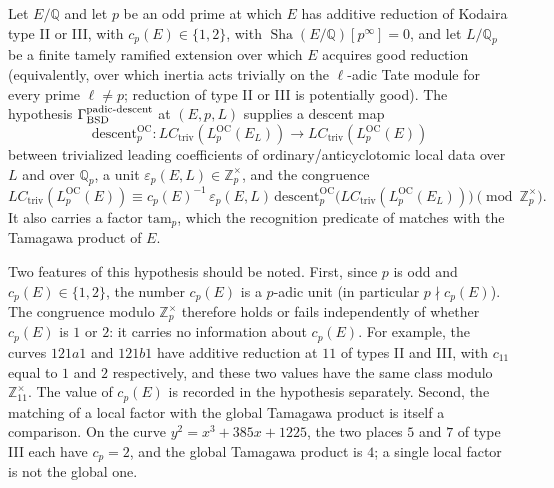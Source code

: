 \documentclass[11pt]{article}
\theoremstyle{definition}
\newcommand{\Q}{\mathbb{Q}}
\newcommand{\Z}{\mathbb{Z}}
\newcommand{\Qp}{\mathbb{Q}_p}
\newcommand{\Zp}{\mathbb{Z}_p}
\newcommand{\Sha}{\operatorname{Sha}}
\begin{document}
\begin{definition}\label{def:closure:gamma-padic-descent}
Let $E/\Q$ and let $p$ be an odd prime at which $E$ has additive
reduction of Kodaira type II or III, with $c_p(E)\in\{1,2\}$, with
$\Sha(E/\Q)[p^\infty]=0$, and let $L/\Qp$ be a finite tamely ramified
extension over which $E$ acquires good reduction (equivalently, over
which inertia acts trivially on the $\ell$-adic Tate module for every
prime $\ell\neq p$; reduction of type II or III is potentially good).  The hypothesis
$\Gamma_{\mathrm{BSD}}^{\mathrm{padic\text{-}descent}}$ at $(E,p,L)$ supplies a descent map
\[
  \mathrm{descent}_p^{\mathrm{OC}}:
  LC_{\mathrm{triv}}(L_p^{\mathrm{OC}}(E_L))
  \longrightarrow
  LC_{\mathrm{triv}}(L_p^{\mathrm{OC}}(E))
\]
between trivialized leading coefficients of ordinary/anticyclotomic local
data over $L$ and over $\Qp$, a unit $\varepsilon_p(E,L)\in\Zp^\times$, and
the congruence
\[
  LC_{\mathrm{triv}}(L_p^{\mathrm{OC}}(E)) \equiv
  c_p(E)^{-1}\,\varepsilon_p(E,L)\,
  \mathrm{descent}_p^{\mathrm{OC}}
    \bigl(LC_{\mathrm{triv}}(L_p^{\mathrm{OC}}(E_L))\bigr)
  \pmod{\Zp^\times}.
\]
It also carries a factor $\mathrm{tam}_p$, which the recognition predicate
of  matches with the Tamagawa product of $E$.
\end{definition}

Two features of this hypothesis should be noted.  First, since $p$ is odd
and $c_p(E)\in\{1,2\}$, the number $c_p(E)$ is a $p$-adic unit (in
particular $p\nmid c_p(E)$).  The congruence modulo $\Zp^\times$ therefore
holds or fails independently of whether $c_p(E)$ is $1$ or $2$: it carries
no information about $c_p(E)$.  For example, the curves $121a1$ and
$121b1$ have additive reduction at $11$ of types II and III, with $c_{11}$
equal to $1$ and $2$ respectively, and these two values have the same
class modulo $\Z_{11}^\times$.  The value of $c_p(E)$ is recorded in the
hypothesis separately.  Second, the matching of a local factor with the
global Tamagawa product is itself a comparison.  On the curve
$y^2=x^3+385x+1225$, the two places $5$ and $7$ of type III each have
$c_p=2$, and the global Tamagawa product is $4$; a single local factor is
not the global one.
\end{document}
